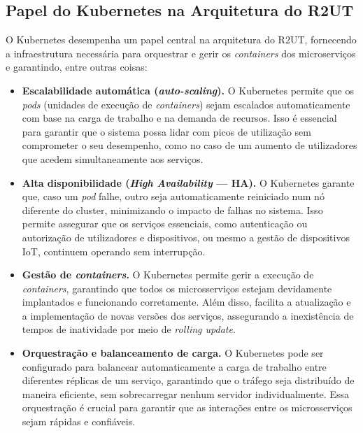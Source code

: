 \subsection{Papel do Kubernetes na Arquitetura do R2UT}

O Kubernetes desempenha um papel central na arquitetura do R2UT, fornecendo a infraestrutura necessária para orquestrar e gerir os \textit{containers} dos microserviços e garantindo, entre outras coisas:

\begin{itemize}
    \item \textbf{Escalabilidade automática (\textit{auto-scaling}).} O Kubernetes permite que os \textit{pods} (unidades de execução de \textit{containers}) sejam escalados automaticamente com base na carga de trabalho e na demanda de recursos. Isso é essencial para garantir que o sistema possa lidar com picos de utilização sem comprometer o seu desempenho, como no caso de um aumento de utilizadores que acedem simultaneamente aos serviços.

    \item \textbf{Alta disponibilidade (\textit{High Availability} — HA).} O Kubernetes garante que, caso um \textit{pod} falhe, outro seja automaticamente reiniciado num nó diferente do cluster, minimizando o impacto de falhas no sistema. Isso permite assegurar que os serviços essenciais, como autenticação ou autorização de utilizadores e dispositivos, ou mesmo a gestão de dispositivos IoT, continuem operando sem interrupção.

    \item \textbf{Gestão de \textit{containers}.} O Kubernetes permite gerir a execução de \textit{containers}, garantindo que todos os microsserviços estejam devidamente implantados e funcionando corretamente. Além disso, facilita a atualização e a implementação de novas versões dos serviços, assegurando a inexistência de tempos de inatividade por meio de \textit{rolling update}.

    \item \textbf{Orquestração e balanceamento de carga.} O Kubernetes pode ser configurado para balancear automaticamente a carga de trabalho entre diferentes réplicas de um serviço, garantindo que o tráfego seja distribuído de maneira eficiente, sem sobrecarregar nenhum servidor individualmente. Essa orquestração é crucial para garantir que as interações entre os microsserviços sejam rápidas e confiáveis.
\end{itemize}


